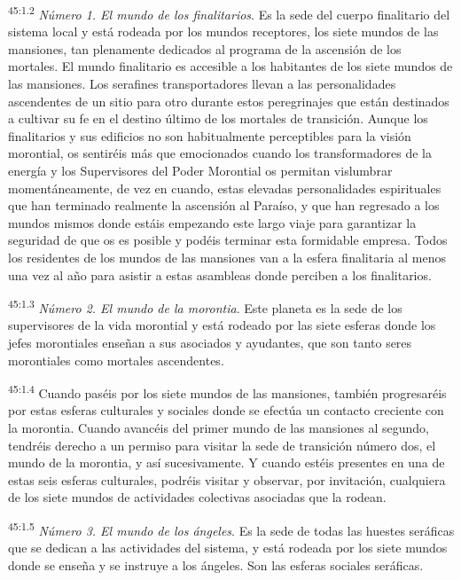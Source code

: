 \par
\textsuperscript{45:1.2} \textit{Número 1. El mundo de los finalitarios}. Es la sede del cuerpo finalitario del sistema local y está rodeada por los mundos receptores, los siete mundos de las mansiones, tan plenamente dedicados al programa de la ascensión de los mortales. El mundo finalitario es accesible a los habitantes de los siete mundos de las mansiones. Los serafines transportadores llevan a las personalidades ascendentes de un sitio para otro durante estos peregrinajes que están destinados a cultivar su fe en el destino último de los mortales de transición. Aunque los finalitarios y sus edificios no son habitualmente perceptibles para la visión morontial, os sentiréis más que emocionados cuando los transformadores de la energía y los Supervisores del Poder Morontial os permitan vislumbrar momentáneamente, de vez en cuando, estas elevadas personalidades espirituales que han terminado realmente la ascensión al Paraíso, y que han regresado a los mundos mismos donde estáis empezando este largo viaje para garantizar la seguridad de que os es posible y podéis terminar esta formidable empresa. Todos los residentes de los mundos de las mansiones van a la esfera finalitaria al menos una vez al año para asistir a estas asambleas donde perciben a los finalitarios.

\par
\textsuperscript{45:1.3} \textit{Número 2. El mundo de la morontia}. Este planeta es la sede de los supervisores de la vida morontial y está rodeado por las siete esferas donde los jefes morontiales enseñan a sus asociados y ayudantes, que son tanto seres morontiales como mortales ascendentes.

\par
\textsuperscript{45:1.4} Cuando paséis por los siete mundos de las mansiones, también progresaréis por estas esferas culturales y sociales donde se efectúa un contacto creciente con la morontia. Cuando avancéis del primer mundo de las mansiones al segundo, tendréis derecho a un permiso para visitar la sede de transición número dos, el mundo de la morontia, y así sucesivamente. Y cuando estéis presentes en una de estas seis esferas culturales, podréis visitar y observar, por invitación, cualquiera de los siete mundos de actividades colectivas asociadas que la rodean.

\par
\textsuperscript{45:1.5} \textit{Número 3. El mundo de los ángeles}. Es la sede de todas las huestes seráficas que se dedican a las actividades del sistema, y está rodeada por los siete mundos donde se enseña y se instruye a los ángeles. Son las esferas sociales seráficas.

